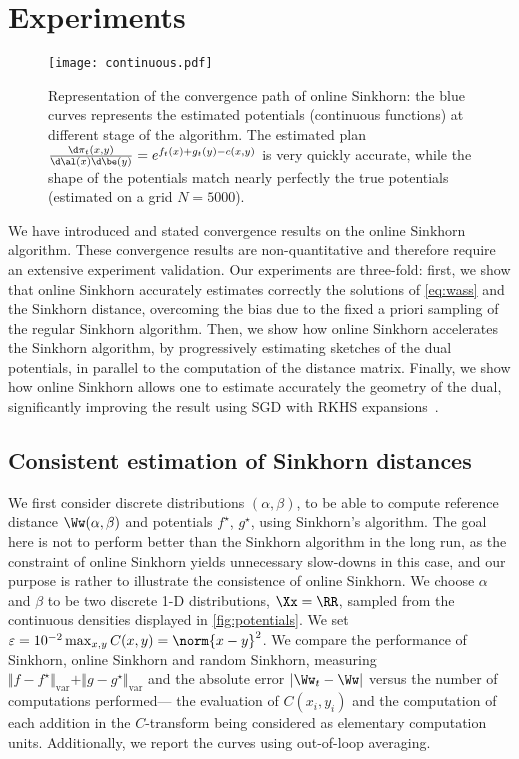 \section{Experiments}\label{sec:exps}

\begin{figure*}[t]
    \centering
    \texttt{[image: continuous.pdf]}
    \caption{Representation of the convergence path of online Sinkhorn: the blue curves represents the estimated potentials (continuous functions) at different stage of the algorithm. The estimated plan $\frac{\d\pi_t(x,y)}{\d\al(x)\d\be(y)} = e^{f_t(x)+g_t(y)-c(x,y)}$ is very quickly accurate, while the shape of the potentials match nearly perfectly the true potentials (estimated on a grid $N = 5000$).}
    \label{fig:potentials}
\end{figure*}


We have introduced and stated convergence results on the online Sinkhorn
algorithm. These convergence results are non-quantitative and therefore
require an extensive experiment validation. Our experiments are three-fold:
first, we show that online Sinkhorn accurately estimates correctly the solutions
of \eqref{eq:wass} and the Sinkhorn distance, overcoming the bias due to
the fixed a priori sampling of the regular Sinkhorn algorithm. Then, we show
how online Sinkhorn accelerates the Sinkhorn algorithm, by progressively estimating sketches
of the dual potentials, in parallel to the computation of the distance matrix. Finally, we show
how online Sinkhorn allows one to estimate accurately the geometry of the dual, significantly improving 
 the result using SGD with RKHS expansions~\citep{2016-genevay-nips}.

\subsection{Consistent estimation of Sinkhorn distances}

We first consider discrete distributions $(\alpha, \beta)$, to be able to compute reference
distance $\Ww(\alpha, \beta)$ and potentials $f^\star$, $g^\star$, using Sinkhorn's
algorithm. The goal here is not to perform better than the Sinkhorn
algorithm in the long run, as the constraint of online Sinkhorn yields unnecessary slow-downs in
this case, and our purpose is rather to illustrate the consistence of online
Sinkhorn. We choose $\alpha$ and $\beta$ to be two discrete 1-D
distributions, $\Xx=\RR$, sampled from the continuous densities displayed in \autoref{fig:potentials}. We set
$\varepsilon = 10^{-2} \max_{x,y} C(x,y)=\norm{x-y}^2$. We
compare the performance of Sinkhorn, online Sinkhorn and random Sinkhorn,
measuring $\Vert f - f^\star \Vert_{\text{var}} + \Vert g - g^\star
\Vert_{\text{var}}$ and the absolute error $| \Ww_t - \Ww |$ versus the number
of computations performed--- the evaluation of $C(x_i, y_i)$ and the computation
of each addition in the $C$-transform being considered as elementary computation units.
Additionally, we report the curves using out-of-loop averaging. 

